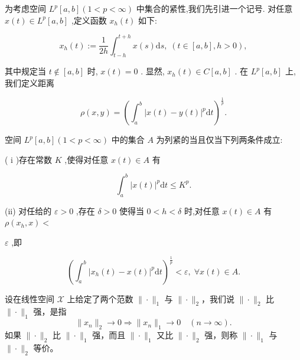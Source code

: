 \documentclass[lang=cn,newtx,10pt,scheme=chinese,thmcnt=chapter]{elegantbook}
\newcommand{\dif}{\mathrm{d}}
\begin{document}
为考虑空间 \({L}^{p}\left\lbrack  {a,b}\right\rbrack  \left( {1 < p < \infty }\right)\) 中集合的紧性,我们先引进一个记号. 对任意 \(x\left( t\right)  \in  {L}^{p}\left\lbrack  {a,b}\right\rbrack\) ,定义函数 \({x}_{h}\left( t\right)\) 如下:

\begin{equation*}
{x}_{h}\left( t\right)  \mathrel{\text{ := }} \frac{1}{2h}{\int }_{t - h}^{t + h}x\left( s\right) {\dif s},\;\left( {t \in  \left\lbrack  {a,b}\right\rbrack  ,h > 0}\right) ,
\end{equation*}

其中规定当 \(t \notin  \left\lbrack  {a,b}\right\rbrack\) 时, \(x\left( t\right)  = 0\) . 显然, \({x}_{h}\left( t\right)  \in  C\left\lbrack  {a,b}\right\rbrack\) . 在 \({L}^{p}\left\lbrack  {a,b}\right\rbrack\) 上,我们定义距离

\begin{equation*}
\rho \left( {x,y}\right)  = {\left( {\int }_{a}^{b}{\left| x\left( t\right)  - y\left( t\right) \right| }^{p}\dif t\right) }^{\frac{1}{p}}.
\end{equation*}
\begin{theorem}
  空间 \({L}^{p}\left\lbrack  {a,b}\right\rbrack  \left( {1 < p < \infty }\right)\) 中的集合 \(A\) 为列紧的当且仅当下列两条件成立:

( i )存在常数 \(K\) ,使得对任意 \(x\left( t\right)  \in  A\) 有

\begin{equation*}
{\int }_{a}^{b}{\left| x\left( t\right) \right| }^{p}{\dif t} \leqslant  {K}^{p}.
\end{equation*}

(ii) 对任给的 \(\varepsilon  > 0\) ,存在 \(\delta  > 0\) 使得当 \(0 < h < \delta\) 时,对任意 \(x\left( t\right)  \in  A\) 有 \(\rho \left( {{x}_{h},x}\right)  <\)

\(\varepsilon\) ,即

\begin{equation*}
{\left( {\int }_{a}^{b}{\left| {x}_{h}\left( t\right)  - x\left( t\right) \right| }^{p}\dif t\right) }^{\frac{1}{p}} < \varepsilon ,\;\forall x\left( t\right)  \in  A.
\end{equation*}

\end{theorem}


\begin{definition}
设在线性空间 \(\mathscr{X}\) 上给定了两个范数 \(\|\cdot\|_1\) 与 \(\|\cdot\|_2\)，我们说 \(\|\cdot\|_2\) 比 \(\|\cdot\|_1\) 强，是指
\[
\|x_n\|_2 \rightarrow 0 \Longrightarrow \|x_n\|_1 \rightarrow 0 \quad (n \rightarrow \infty).
\]
如果 \(\|\cdot\|_2\) 比 \(\|\cdot\|_1\) 强，而且 \(\|\cdot\|_1\) 又比 \(\|\cdot\|_2\) 强，则称 \(\|\cdot\|_1\) 与 \(\|\cdot\|_2\) 等价。
\end{definition}
\end{document}
